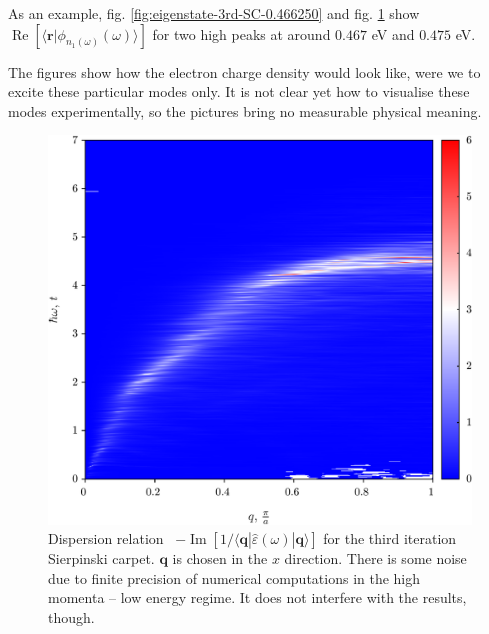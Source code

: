 \documentclass[a4paper,12pt]{article}
\begin{document}
    As an example, fig. \ref{fig:eigenstate-3rd-SC-0.466250} and fig. \ref{fig:eigenstate-3rd-SC-real-0.474250} show $\operatorname{Re} [\langle \mathbf{r} | \phi_{n_1(\omega)}(\omega) \rangle]$ for two high peaks at around $0.467$ eV and $0.475$ eV. 
    \begin{figure}[h] 
    \begin{minipage}{.5\textwidth}
        
        \captionsetup{width=0.9\linewidth}
        \label{fig:eigenstate-3rd-SC-0.466250}
    \end{minipage}%
    \begin{minipage}{.5\textwidth}
        
        \captionsetup{width=0.9\linewidth}
        \label{fig:eigenstate-3rd-SC-real-0.474250}
    \end{minipage}
    \end{figure}
    The figures show how the electron charge density would look like, were we to excite these particular modes only. It is not clear yet how to visualise these modes experimentally, so the pictures bring no measurable physical meaning.

    \begin{figure}[h]
    \center
    \includegraphics[width=\textwidth]{Spectrum-3rd-Q-Omega.png}
    \caption{Dispersion relation \ $-\operatorname{Im}[1 / \langle\mathbf{q}| \hat\varepsilon(\omega) |\mathbf{q}\rangle]$ for the third iteration Sierpinski carpet. $\mathbf{q}$ is chosen in the $x$ direction. There is some noise due to finite precision of numerical computations in the high momenta -- low energy regime. It does not interfere with the results, though.}
    \label{fig:spectrum-3rd-Q-Omega}
    \end{figure}
\end{document}
